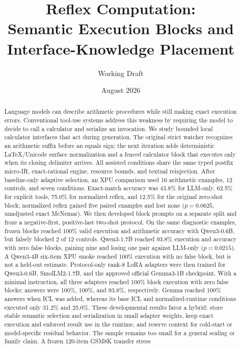 \documentclass[11pt]{article}
\title{Reflex Computation:\\
Semantic Execution Blocks and Interface-Knowledge Placement}
\author{Working Draft}
\date{August 2026}
\begin{document}
\maketitle

\begin{abstract}
Language models can describe arithmetic procedures while still making exact
execution errors. Conventional tool-use systems address this weakness by
requiring the model to decide to call a calculator and serialize an invocation.
We study bounded local calculator interfaces that act during generation. The
original strict watcher recognizes an arithmetic suffix before an equals sign;
the next iteration adds deterministic LaTeX/Unicode surface normalization and
a fenced calculator block that executes only when its closing delimiter arrives.
All assisted conditions share the same typed postfix micro-IR, exact-rational
engine, resource bounds, and textual reinjection. After baseline-only adaptive
selection, an XPU comparison used 16 arithmetic examples, 12 controls, and seven
conditions. Exact-match accuracy was 43.8\% for LLM-only, 62.5\% for explicit
tools, 75.0\% for normalized reflex, and 12.5\% for the original zero-shot block;
normalized reflex gained five paired examples and lost none ($p=0.0625$,
unadjusted exact McNemar). We then developed block prompts on a separate split
and froze a negative-first, positive-last two-shot protocol. On the same
diagnostic examples, frozen blocks reached 100\% valid execution and arithmetic
accuracy with Qwen3-0.6B, but falsely blocked 2 of 12 controls. Qwen3-1.7B reached
93.8\% execution and accuracy with zero false blocks, gaining nine and losing one
pair against LLM-only ($p=0.0215$). A Qwen3-4B six-item XPU smoke reached 100\%
execution with no false block, but is not a held-out estimate. Protocol-only
rank-8 LoRA adapters were then trained for Qwen3-0.6B, SmolLM2-1.7B, and the
approved official Gemma3-1B checkpoint. With a minimal instruction, all three
adapters reached 100\% block execution with zero false blocks; answers were
100\%, 100\%, and 93.8\%, respectively. Gemma reached 100\% answers when ICL was
added, whereas its base ICL and normalized-runtime conditions executed only
31.2\% and 25.0\%. These developmental results favor a hybrid: store stable
semantic selection and serialization in small adapter weights, keep exact
execution and enforced result use in the runtime, and reserve context for
cold-start or model-specific residual behavior. The sample remains too small
for a general scaling or family claim. A frozen 120-item GSM8K transfer stress

\end{abstract}
\end{document}
